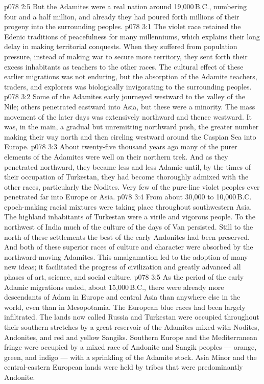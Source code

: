 \vs p078 2:5 But the Adamites were a real nation around 19,000\,B.C., numbering four and a half million, and already they had poured forth millions of their progeny into the surrounding peoples.
\vs p078 3:1 The violet race retained the Edenic traditions of peacefulness for many millenniums, which explains their long delay in making territorial conquests. When they suffered from population pressure, instead of making war to secure more territory, they sent forth their excess inhabitants as teachers to the other races. The cultural effect of these earlier migrations was not enduring, but the absorption of the Adamite teachers, traders, and explorers was biologically invigorating to the surrounding peoples.
\vs p078 3:2 Some of the Adamites early journeyed westward to the valley of the Nile; others penetrated eastward into Asia, but these were a minority. The mass movement of the later days was extensively northward and thence westward. It was, in the main, a gradual but unremitting northward push, the greater number making their way north and then circling westward around the Caspian Sea into Europe.
\vs p078 3:3 About twenty\hyp{}five thousand years ago many of the purer elements of the Adamites were well on their northern trek. And as they penetrated northward, they became less and less Adamic until, by the times of their occupation of Turkestan, they had become thoroughly admixed with the other races, particularly the Nodites. Very few of the pure\hyp{}line violet peoples ever penetrated far into Europe or Asia.
\vs p078 3:4 From about 30,000 to 10,000\,B.C. epoch\hyp{}making racial mixtures were taking place throughout southwestern Asia. The highland inhabitants of Turkestan were a virile and vigorous people. To the northwest of India much of the culture of the days of Van persisted. Still to the north of these settlements the best of the early Andonites had been preserved. And both of these superior races of culture and character were absorbed by the northward\hyp{}moving Adamites. This amalgamation led to the adoption of many new ideas; it facilitated the progress of civilization and greatly advanced all phases of art, science, and social culture.
\vs p078 3:5 \pc As the period of the early Adamic migrations ended, about 15,000\,B.C., there were already more descendants of Adam in Europe and central Asia than anywhere else in the world, even than in Mesopotamia. The European blue races had been largely infiltrated. The lands now called Russia and Turkestan were occupied throughout their southern stretches by a great reservoir of the Adamites mixed with Nodites, Andonites, and red and yellow Sangiks. Southern Europe and the Mediterranean fringe were occupied by a mixed race of Andonite and Sangik peoples --- orange, green, and indigo --- with a sprinkling of the Adamite stock. Asia Minor and the central\hyp{}eastern European lands were held by tribes that were predominantly Andonite.
